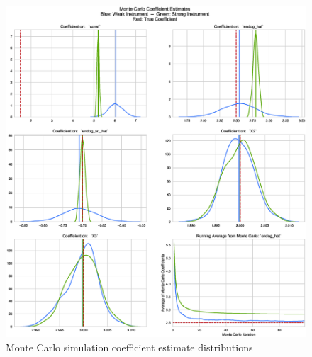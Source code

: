 \documentclass[12pt]{article}
\begin{document}
\begin{figure}[H]
\centering
\captionsetup{width=1\linewidth}
\includegraphics[width=1\linewidth]{figures/MC_strong_and_weak.eps}
\caption{Monte Carlo simulation coefficient estimate distributions}
\label{fig:MC_dists}
\end{figure}
\end{document}
